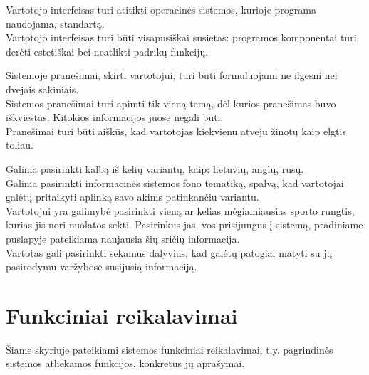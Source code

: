 \documentclass{VUMIFPSkursinis}
\begin{document}
\begin{longtabu}
    {
      Vartotojo interfeisas turi atitikti operacinės sistemos, kurioje programa naudojama, standartą. \\
      Vartotojo interfeisas turi būti visapusiškai susietas: programos komponentai turi derėti estetiškai bei neatlikti padrikų funkcijų. 
    }

    {
      Sistemoje pranešimai, skirti vartotojui, turi būti formuluojami ne ilgesni nei dvejais sakiniais. \\                                      
      Sistemos pranešimai turi apimti tik vieną temą, dėl kurios pranešimas buvo iškviestas. Kitokios informacijos juose negali būti. \\
      Pranešimai turi būti aiškūs, kad vartotojas kiekvienu atveju žinotų kaip elgtis toliau.
    }
    
    {
      Galima pasirinkti kalbą iš kelių variantų, kaip: lietuvių, anglų, rusų. \\
      Galima pasirinkti informacinės sistemos fono tematiką, spalvą, kad vartotojai galėtų pritaikyti aplinką savo akims patinkančiu variantu. \\
      Vartotojui yra galimybė pasirinkti vieną ar kelias mėgiamiausias sporto rungtis, kurias jis nori nuolatos sekti. 
		Pasirinkus jas, vos prisijungus į sistemą, pradiniame puslapyje pateikiama naujausia šių sričių informacija. \\
      Vartotas gali pasirinkti sekamus dalyvius, kad galėtų patogiai matyti su jų pasirodymu varžybose susijusią informaciją.
    }
  \end{longtabu}
\section{Funkciniai reikalavimai} \label{funkciniaiReikalavimai}
  Šiame skyriuje pateikiami sistemos funkciniai reikalavimai, t.y. pagrindinės sistemos atliekamos funkcijos, konkretūs jų aprašymai.
\end{document}
